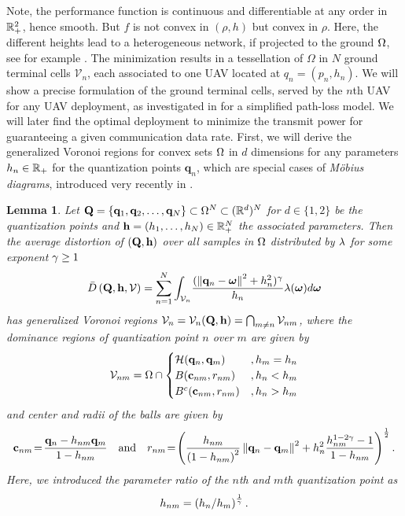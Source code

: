 \documentclass[12pt,onecolumn,final,letterpaper]{IEEEtran}
\newtheorem{lemma}{Lemma}
\newcounter{example}[section]
\renewcommand{\vp}{\mathbf q}
\renewcommand{\vP}{\mathbf Q}
\newcommand{\HS}{\ensuremath{\mathcal{H}}}          %
\newcommand{\df}{\ensuremath{\lam}}         %
\newcommand{\gP}{\ensuremath{\vP}}          %
\newcommand{\gp}{\ensuremath{\vp}}          %
\newcommand{\fH}{\ensuremath{\vh}}          %
\newcommand{\fh}{\ensuremath{h}}          %
\newcommand{\Vor}{\ensuremath{\mathcal{V}}}         %
\newcommand{\Dis}{\ensuremath{D}}                    %
\newcommand{\AvDis}{\ensuremath{\bar{\Dis}}}         %
\begin{document}
  Note, the performance function is continuous and differentiable at any order in ${\mathbb R}^2_+$, hence smooth. But $f$ is not
  convex in $(\rho,h)$ but convex in $\rho$. 
  Here, the different heights lead to a heterogeneous network, if projected to the ground $\Omega$, see for example
  \cite{GJ16a}.  The minimization results in a tessellation of $\Omega$ in $N$ ground terminal cells $\Vor_n$, each
  associated to one UAV located at $q_n=(p_n,h_n)$.  We will show a precise formulation of the ground terminal cells,
  served by the $n$th UAV for any UAV deployment, as investigated in \cite{MSBD16b} for a simplified path-loss model. We
  will later find the optimal deployment to minimize the transmit power for guaranteeing a given communication data rate.
  \fi
%
First, we will derive the generalized Voronoi regions for convex sets $\Omega$ in $d$ dimensions for any parameters
$h_n\in{\ensuremath{\mathbb R}}_+$  for the quantization points $\vp_n$, which are special cases of \emph{M{\"o}bius diagrams},
introduced very recently in \cite{BWY07}. 
%
\begin{lemma}\label{lem:moebiusdia}
  Let $\vP=\{\gp_1,\gp_2,\dots, \gp_N\}\subset \Omega^N\subset (\R^d)^N$ for $d\in\{1,2\}$ be the quantization points 
  and $\fH=(\fh_1,\dots,\fh_N)\in\R_+^N$  the associated parameters. Then the average distortion of $(\vP,\vh)$ 
  over all samples in $\Omega$ distributed by $\df$ for  some exponent $\gamma\geq1$ 
  \begin{align}
    \AvDis\left(\vP,\fH, \Vor\right) 
    = \sum_{n=1}^{N} \int_{\Vor_n} \! \frac{ (\Norm{\gp_n- \vome}^2 +h_n^2)^{\gam}}{h_n} \df(\vome)d\vome
       \label{eq:minimizationmoebius}
  \end{align}
  has generalized Voronoi regions $\Vor_n= \Vor_{n}(\gP,\fH)= \bigcap_{m\not=n} \Vor_{nm}$, 
  where the dominance regions of quantization point $n$ over $m$ are given by
  \begin{align}
    \Vor_{nm}=\Omega\cap\begin{cases}
         \HS(\gp_n,\gp_m)&, h_m=h_n \\
         B(\vc_{nm},r_{nm}) &, h_n<h_m\\
         B^c(\vc_{nm},r_{nm}) &, h_n>h_m 
        \end{cases}\label{eq:moebius}
  \end{align}
  and center and radii of the balls are given by
  \begin{align}
    \vc_{nm}\!=\!\frac{\gp_n - h_{nm}\gp_m}{1-h_{nm}}
    \quad\text{and}\quad 
    r_{nm}\!=\!\left(\frac{h_{nm}}{\left(1-h_{nm}\right)^2}\Norm{\gp_n-\gp_m}^2  + h_n^2 \frac{h_{nm}^{1-2\gam}
  -1}{1-h_{nm}}\right)^{\frac{1}{2}}.
  \label{eq:rnmcnm}
  \end{align}
  Here, we introduced the parameter ratio of the $n$th and $m$th quantization point as
  \begin{align}
    h_{nm}= \left(h_n/h_m\right)^{\frac{1}{\gamma}}.
  \end{align}
\end{lemma}
\end{document}
